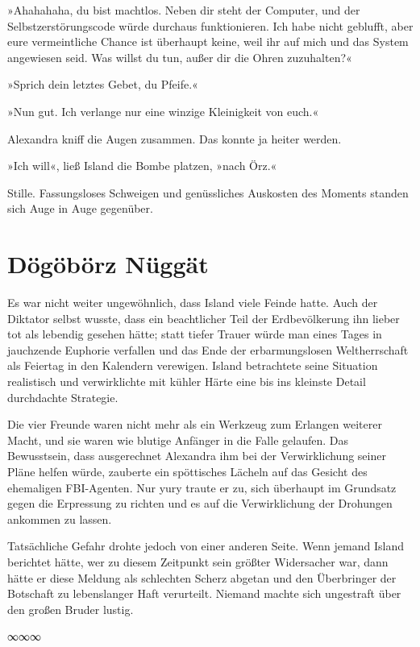 »Ahahahaha, du bist machtlos. Neben dir steht der Computer, und der Selbstzerstörungscode würde durchaus funktionieren. Ich habe nicht geblufft, aber eure vermeintliche Chance ist überhaupt keine, weil ihr auf mich und das System angewiesen seid. Was willst du tun, außer dir die Ohren zuzuhalten?«

»Sprich dein letztes Gebet, du Pfeife.«

»Nun gut. Ich verlange nur eine winzige Kleinigkeit von euch.«

Alexandra kniff die Augen zusammen. Das konnte ja heiter werden.

»Ich will«, ließ Island die Bombe platzen, »nach Örz.«

Stille. Fassungsloses Schweigen und genüssliches Auskosten des Moments standen sich Auge in Auge gegenüber.

\chapter{Dögöbörz Nüggät}

Es war nicht weiter ungewöhnlich, dass Island viele Feinde hatte. Auch der Diktator selbst wusste, dass ein beachtlicher Teil der Erdbevölkerung ihn lieber tot als lebendig gesehen hätte; statt tiefer Trauer würde man eines Tages in jauchzende Euphorie verfallen und das Ende der erbarmungslosen Weltherrschaft als Feiertag in den Kalendern verewigen. Island betrachtete seine Situation realistisch und verwirklichte mit kühler Härte eine bis ins kleinste Detail durchdachte Strategie.

Die vier Freunde waren nicht mehr als ein Werkzeug zum Erlangen weiterer Macht, und sie waren wie blutige Anfänger in die Falle gelaufen. Das Bewusstsein, dass ausgerechnet Alexandra ihm bei der Verwirklichung seiner Pläne helfen würde, zauberte ein spöttisches Lächeln auf das Gesicht des ehemaligen FBI-Agenten. Nur yury traute er zu, sich überhaupt im Grundsatz gegen die Erpressung zu richten und es auf die Verwirklichung der Drohungen ankommen zu lassen.

Tatsächliche Gefahr drohte jedoch von einer anderen Seite. Wenn jemand Island berichtet hätte, wer zu diesem Zeitpunkt sein größter Widersacher war, dann hätte er diese Meldung als schlechten Scherz abgetan und den Überbringer der Botschaft zu lebenslanger Haft verurteilt. Niemand machte sich ungestraft über den großen Bruder lustig.

\begin{center}
	∞∞∞
\end{center}

